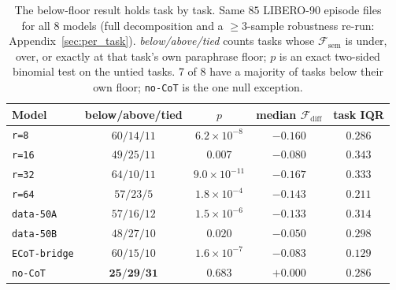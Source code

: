 \documentclass{article}
\begin{document}
\begin{table}[t]
\centering\small
\setlength{\tabcolsep}{4.5pt}
\renewcommand{\arraystretch}{0.92}
\begin{tabular}{@{}l ccc c@{}}
\toprule
Model & below/above/tied & $p$ & median $\mathcal{F}_{\text{diff}}$ & task IQR \\
\midrule
\texttt{r=8}         & $60/14/11$ & $6.2{\times}10^{-8}$  & $-0.160$ & $0.286$ \\
\texttt{r=16}        & $49/25/11$ & $0.007$  & $-0.080$ & $0.343$ \\
\texttt{r=32}        & $64/10/11$ & $9.0{\times}10^{-11}$ & $-0.167$ & $0.333$ \\
\texttt{r=64}        & $57/23/5$  & $1.8{\times}10^{-4}$  & $-0.143$ & $0.211$ \\
\texttt{data-50A}    & $57/16/12$ & $1.5{\times}10^{-6}$  & $-0.133$ & $0.314$ \\
\texttt{data-50B}    & $48/27/10$ & $0.020$  & $-0.050$ & $0.298$ \\
\texttt{ECoT-bridge} & $60/15/10$ & $1.6{\times}10^{-7}$  & $-0.083$ & $0.129$ \\
\texttt{no-CoT}      & $\mathbf{25/29/31}$ & $\mathbf{0.683}$ & $+0.000$ & $0.286$ \\
\bottomrule
\end{tabular}
\caption{The below-floor result holds task by task. Same $85$ LIBERO-90 episode files for all $8$ models (full decomposition and a $\geq 3$-sample robustness re-run: Appendix~\ref{sec:per_task}). \emph{below/above/tied} counts tasks whose $\mathcal{F}_{\text{sem}}$ is under, over, or exactly at that task's own paraphrase floor; $p$ is an exact two-sided binomial test on the untied tasks. 7 of 8 have a majority of tasks below their own floor; \texttt{no-CoT} is the one null exception.}
\label{tab:per_task_headline}
\end{table}
\end{document}
